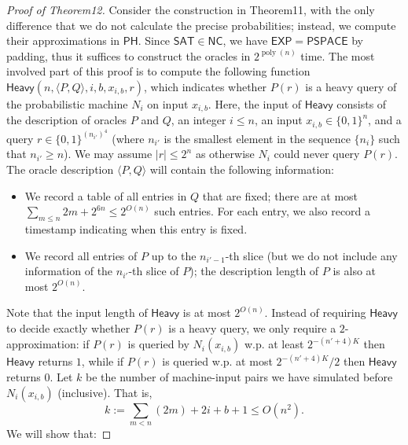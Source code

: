 \documentclass[10pt,a4paper]{article}
\begin{document}
\begin{proof}[Proof of Theorem12]
Consider the construction in Theorem11, with the only difference that we do not calculate the precise probabilities; instead, we compute their approximations in $\mathsf{PH}$. Since $\mathsf{SAT}\in\mathsf{NC}$, we have $\mathsf{EXP}=\mathsf{PSPACE}$ by padding, thus it suffices to construct the oracles in $2^{\operatorname{poly}(n)}$ time.
The most involved part of this proof is to compute the following function $\mathsf{Heavy}(n,\langle P,Q\rangle,i,b,x_{i,b},r)$, which indicates whether $P(r)$ is a heavy query of the probabilistic machine $N_i$ on input $x_{i,b}$. Here, the input of $\mathsf{Heavy}$ consists of the description of oracles $P$ and $Q$, an integer $i\leq n$, an input $x_{i,b}\in\{0,1\}^n$, and a query $r\in\{0,1\}^{(n_{i'})^4}$ (where $n_{i'}$ is the smallest element in the sequence $\{n_i\}$ such that $n_{i'}\geq n$). We may assume $|r|\leq2^n$ as otherwise $N_i$ could never query $P(r)$. The oracle description $\langle P,Q\rangle$ will contain the following information:
\begin{itemize}
\item We record a table of all entries in $Q$ that are fixed; there are at most $\sum_{m\leq n}2m+2^{6n}\leq2^{O(n)}$ such entries. For each entry, we also record a timestamp indicating when this entry is fixed.
\item We record all entries of $P$ up to the $n_{i'-1}$-th slice (but we do not include any information of the $n_{i'}$-th slice of $P$); the description length of $P$ is also at most $2^{O(n)}$.
\end{itemize}
Note that the input length of $\mathsf{Heavy}$ is at most $2^{O(n)}$. Instead of requiring $\mathsf{Heavy}$ to decide exactly whether $P(r)$ is a heavy query, we only require a $2$-approximation: if $P(r)$ is queried by $N_i(x_{i,b})$ w.p. at least $2^{-(n'+4)K}$ then $\mathsf{Heavy}$ returns $1$, while if $P(r)$ is queried w.p. at most $2^{-(n'+4)K}/2$ then $\mathsf{Heavy}$ returns $0$.
Let $k$ be the number of machine-input pairs we have simulated before $N_i(x_{i,b})$ (inclusive). That is,
\[k:=\sum_{m<n}(2m)+2i+b+1\leq O(n^2).\]
We will show that:

\end{proof}
\end{document}
